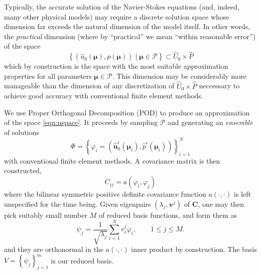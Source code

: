 \documentclass[onecolumn, twoside, a4paper, 11pt]{article}
\begin{document}
Typically, the accurate solution of the Navier-Stokes equations (and, indeed,
many other physical models) may require a discrete solution space whose
dimension far exceeds the natural dimension of the model itself. In other words,
the \emph{practical} dimension (where by ``practical'' we mean
``within reasonable error'') of the space
\begin{equation}
  \left\{ (\hat{u}_0(\bm \mu), p(\bm \mu)) \;|\; \bm \mu \in \mathcal{P} \right\}
  \subset \hat{U}_0 \times \hat{P}
  \label{eqn:nspace}
\end{equation}
which by construction is the space with the most suitable approximation
properties for all parameters $\bm \mu \in \mathcal{P}$. This dimension may be
considerably more manageable than the dimension of any discretization of
$\hat{U}_0 \times \hat{P}$ neccessary to achieve good accuracy with conventional
finite element methods.

We use Proper Orthogonal Decomposition (POD)
\cite{Chatterjee2000ipo,Quarteroni2016rbm} to produce an approximation of the
space \eqref{eqn:nspace}. It proceeds by sampling $\mathcal{P}$ and generating
an \emph{ensemble} of solutions
\[
  \Phi = \left\{
    \varphi_i = (\hat{\bm u}^i_0(\bm \mu_i), \hat{p}^i(\bm \mu_i))
  \right\}_{i=1}^N
\]
with conventional finite element methods. A covariance matrix is then
constructed,
\[
  C_{ij} = a(\varphi_i, \varphi_j)
\]
where the bilinear symmetric positive definite covariance function
$a(\cdot,\cdot)$ is left unspecified for the time being. Given eigenpairs
$(\lambda_j, \bm v^j)$ of $\bm C$, one may then pick suitably small number $M$
of reduced basis functions, and form them as \cite[(6.10)]{Quarteroni2016rbm}
\begin{equation}
  \label{eqn:spd}
  \psi_j = \frac{1}{\sqrt{\lambda_j}} \sum_{i=1}^N v^j_i \varphi_i,
  \qquad 1 \leq j \leq M.
\end{equation}
and they are orthonormal in the $a(\cdot,\cdot)$ inner product by construction.
The basis $V = \left\{ \psi_j \right\}_{j=1}^m$ is our reduced basis.
\end{document}
